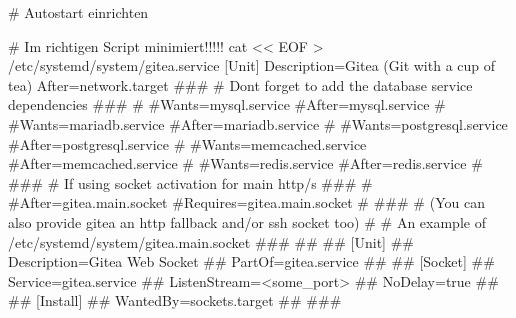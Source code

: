 \documentclass[
  letterpaper,
  DIV=11]{scrreprt}
\newenvironment{Shaded}{\begin{snugshade}}{\end{snugshade}}
\newcommand{\CommentTok}[1]{\textcolor[rgb]{0.37,0.37,0.37}{#1}}
\newcommand{\FunctionTok}[1]{\textcolor[rgb]{0.28,0.35,0.67}{#1}}
\newcommand{\NormalTok}[1]{\textcolor[rgb]{0.00,0.23,0.31}{#1}}
\newcommand{\OperatorTok}[1]{\textcolor[rgb]{0.37,0.37,0.37}{#1}}
\newcommand{\StringTok}[1]{\textcolor[rgb]{0.13,0.47,0.30}{#1}}
\begin{document}
\begin{Shaded}
\begin{Highlighting}[]
\CommentTok{\# Autostart einrichten }

\CommentTok{\# Im richtigen Script minimiert!!!!!}
\FunctionTok{cat} \OperatorTok{\textless{}\textless{} EOF} \OperatorTok{\textgreater{}}\NormalTok{ /etc/systemd/system/gitea.service}
\StringTok{ }
\StringTok{[Unit]}
\StringTok{Description=Gitea (Git with a cup of tea)}
\StringTok{After=network.target}
\StringTok{\#\#\#}
\StringTok{\# Don\textquotesingle{}t forget to add the database service dependencies}
\StringTok{\#\#\#}
\StringTok{\#}
\StringTok{\#Wants=mysql.service}
\StringTok{\#After=mysql.service}
\StringTok{\#}
\StringTok{\#Wants=mariadb.service}
\StringTok{\#After=mariadb.service}
\StringTok{\#}
\StringTok{\#Wants=postgresql.service}
\StringTok{\#After=postgresql.service}
\StringTok{\#}
\StringTok{\#Wants=memcached.service}
\StringTok{\#After=memcached.service}
\StringTok{\#}
\StringTok{\#Wants=redis.service}
\StringTok{\#After=redis.service}
\StringTok{\#}
\StringTok{\#\#\#}
\StringTok{\# If using socket activation for main http/s}
\StringTok{\#\#\#}
\StringTok{\#}
\StringTok{\#After=gitea.main.socket}
\StringTok{\#Requires=gitea.main.socket}
\StringTok{\#}
\StringTok{\#\#\#}
\StringTok{\# (You can also provide gitea an http fallback and/or ssh socket too)}
\StringTok{\#}
\StringTok{\# An example of /etc/systemd/system/gitea.main.socket}
\StringTok{\#\#\#}
\StringTok{\#\#}
\StringTok{\#\# [Unit]}
\StringTok{\#\# Description=Gitea Web Socket}
\StringTok{\#\# PartOf=gitea.service}
\StringTok{\#\#}
\StringTok{\#\# [Socket]}
\StringTok{\#\# Service=gitea.service}
\StringTok{\#\# ListenStream=\textless{}some\_port\textgreater{}}
\StringTok{\#\# NoDelay=true}
\StringTok{\#\#}
\StringTok{\#\# [Install]}
\StringTok{\#\# WantedBy=sockets.target}
\StringTok{\#\#}
\StringTok{\#\#\#}


\end{Highlighting}
\end{Shaded}
\end{document}
